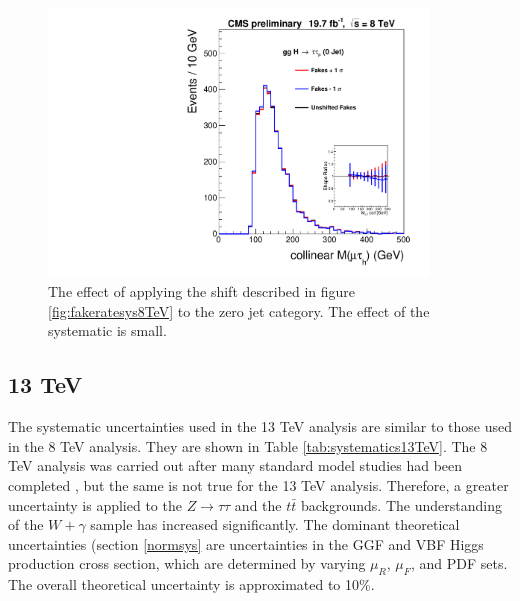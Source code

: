 \documentclass[oneside, letterpaper, oldfontcommands]{memoir}
\begin{document}
\begin{figure}[hbtp]\centering
\includegraphics[width=0.9\textwidth]{FakesUpDownShift.pdf}

\caption{The effect of applying the shift described in figure \ref{fig:fakeratesys8TeV} to the zero jet category. The effect of the systematic is small.} 
\label{fig:fakerateupdownsigma}\end{figure}

\subsection{13 TeV}
\qquad The systematic uncertainties used in the 13 TeV analysis are similar to those used in the 8 TeV analysis. They are shown in Table \ref{tab:systematics13TeV}. The 8 TeV analysis was carried out after many standard model studies had been completed \cite{1748-0221-6-11-P11002} \cite{CMS-PAS-EWK-10-002}, but the same is not true for the 13 TeV analysis. Therefore, a greater uncertainty is applied to the $Z \rightarrow \tau\tau$ and the $t\bar{t}$ backgrounds. The understanding of the $W+\gamma$ sample has increased significantly. The dominant theoretical uncertainties (section \ref{normsys} are  uncertainties in the GGF and VBF Higgs production cross section, which are determined by varying $\mu_{R}$, $\mu_{F}$, and PDF sets. The overall theoretical uncertainty is approximated to 10\%. 
\end{document}
